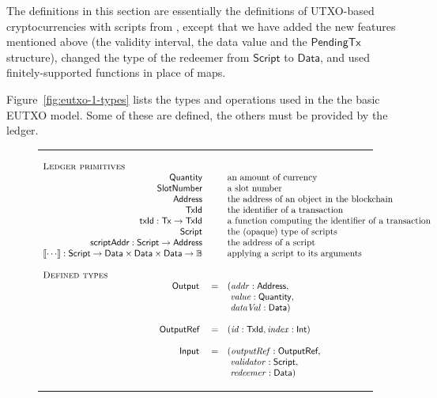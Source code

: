 \documentclass[a4paper]{article}
\newcommand{\s}{\textsf}  %
\newcommand{\msf}[1]{\ensuremath{\mathsf{#1}}}
\newcommand{\mi}[1]{\ensuremath{\mathit{#1}}}
\newcommand\rfskip{7pt}
\newenvironment{ruledfigure}[1]{\begin{figure}[#1]\hrule\vspace{\rfskip}}{\vspace{\rfskip}\hrule\end{figure}}
\newcommand{\script}{\ensuremath{\s{Script}}}
\newcommand{\scriptAddr}{\msf{scriptAddr}}
\newcommand{\ptx}{\ensuremath{\s{PendingTx}}}
\newcommand{\TxId}{\ensuremath{\s{TxId}}}
\newcommand{\txId}{\msf{txId}}
\newcommand{\txrefid}{\mi{id}}
\newcommand{\Address}{\ensuremath{\s{Address}}}
\newcommand{\idx}{\mi{index}}
\newcommand{\addr}{\mi{addr}}
\newcommand{\val}{\mi{value}}  %
\newcommand{\validator}{\mi{validator}}
\newcommand{\redeemer}{\mi{redeemer}}
\newcommand{\dataval}{\mi{dataVal}}
\newcommand{\Data}{\ensuremath{\s{Data}}}
\newcommand{\outputref}{\mi{outputRef}}
\newcommand{\slotnum}{\ensuremath{\s{SlotNumber}}}
\newcommand{\eutxotx}{\msf{Tx}}
\newcommand{\qty}{\ensuremath{\s{Quantity}}}
\newcommand\B{\ensuremath{\mathbb{B}}}
\begin{document}
The definitions in this section are essentially the definitions of
UTXO-based cryptocurrencies with scripts from
\citep{Zahnentferner18-UTxO}, except that we have added the new
features mentioned above (the validity interval, the data value
and the \ptx{} structure), changed the type of the redeemer from
\script{} to \Data{}, and used finitely-supported functions in place
of maps.

Figure~\ref{fig:eutxo-1-types} lists the types and operations used in the
the basic EUTXO model. Some of these are defined, the others must be provided by
the ledger.
\begin{ruledfigure}{H}
  \begin{displaymath}
  \begin{array}{rll}
    \multicolumn{3}{l}{\textsc{Ledger primitives}}\\
    \qty{} && \mbox{an amount of currency}\\
    \slotnum && \mbox{a slot number}\\
    \Address && \mbox{the address of an object in the blockchain}\\
    \TxId && \mbox{the identifier of a transaction}\\
    \txId : \eutxotx \rightarrow \TxId && \mbox{a function computing the identifier of a transaction}\\
    \script && \mbox{the (opaque) type of scripts}\\
    \scriptAddr : \script \rightarrow \Address && \mbox{the address of a script}\\
    \llbracket \cdots \rrbracket : \script \rightarrow \Data \times \Data \times
    \Data \rightarrow \B && \mbox{applying a script to its arguments}\\
    \\
    \multicolumn{3}{l}{\textsc{Defined types}}\\
    \s{Output } &=&(\addr: \Address,\\
                & &\ \val: \qty,\\
                & &\ \dataval: \Data)\\
    \\
    \s{OutputRef } &=&(\txrefid: \TxId, \idx: \s{Int})\\
    \\
    \s{Input } &=&(\outputref: \s{OutputRef},\\
               & &\ \validator: \script,\\
               & &\ \redeemer: \Data)\\

\end{array}
\end{displaymath}
\end{ruledfigure}
\end{document}
